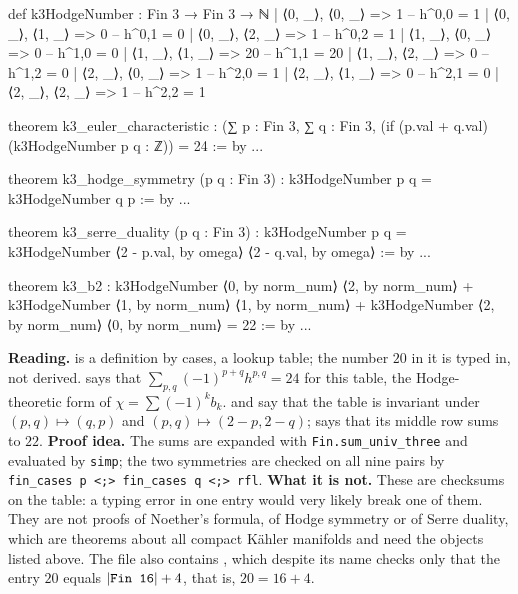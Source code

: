 \begin{leancode}
def k3HodgeNumber : Fin 3 → Fin 3 → ℕ
  | ⟨0, _⟩, ⟨0, _⟩ => 1   -- h^{0,0} = 1
  | ⟨0, _⟩, ⟨1, _⟩ => 0   -- h^{0,1} = 0
  | ⟨0, _⟩, ⟨2, _⟩ => 1   -- h^{0,2} = 1
  | ⟨1, _⟩, ⟨0, _⟩ => 0   -- h^{1,0} = 0
  | ⟨1, _⟩, ⟨1, _⟩ => 20  -- h^{1,1} = 20
  | ⟨1, _⟩, ⟨2, _⟩ => 0   -- h^{1,2} = 0
  | ⟨2, _⟩, ⟨0, _⟩ => 1   -- h^{2,0} = 1
  | ⟨2, _⟩, ⟨1, _⟩ => 0   -- h^{2,1} = 0
  | ⟨2, _⟩, ⟨2, _⟩ => 1   -- h^{2,2} = 1

theorem k3_euler_characteristic :
    (∑ p : Fin 3, ∑ q : Fin 3,
      (if (p.val + q.val) %
      (k3HodgeNumber p q : ℤ)) = 24 := by ...

theorem k3_hodge_symmetry (p q : Fin 3) :
    k3HodgeNumber p q = k3HodgeNumber q p := by ...

theorem k3_serre_duality (p q : Fin 3) :
    k3HodgeNumber p q =
      k3HodgeNumber ⟨2 - p.val, by omega⟩ ⟨2 - q.val, by omega⟩ := by ...

theorem k3_b2 :
    k3HodgeNumber ⟨0, by norm_num⟩ ⟨2, by norm_num⟩ +
    k3HodgeNumber ⟨1, by norm_num⟩ ⟨1, by norm_num⟩ +
    k3HodgeNumber ⟨2, by norm_num⟩ ⟨0, by norm_num⟩ = 22 := by ...
\end{leancode}

\begin{leanbox}
\textbf{Reading.}  is a definition by cases, a lookup table; the number $20$
in it is typed in, not derived.  says that
$\sum_{p,q}(-1)^{p+q}h^{p,q}=24$ for this table, the Hodge-theoretic form of $\chi=\sum(-1)^kb_k$.
 and  say that the table is invariant under
$(p,q)\mapsto(q,p)$ and $(p,q)\mapsto(2-p,2-q)$;  says that its middle row sums to
$22$. \textbf{Proof idea.} The sums are expanded with \texttt{Fin.sum\_univ\_three} and
evaluated by \texttt{simp}; the two symmetries are checked on all nine pairs by
\texttt{fin\_cases p <;> fin\_cases q <;> rfl}. \textbf{What it is not.} These are checksums on
the table: a typing error in one entry would very likely break one of them. They are not proofs
of Noether's formula, of Hodge symmetry or of Serre duality, which are theorems about all
compact Kähler manifolds and need the objects listed above. The file also contains , which despite its name checks only
that the entry $20$ equals $|\texttt{Fin 16}|+4$, that is, $20=16+4$.
\end{leanbox}

